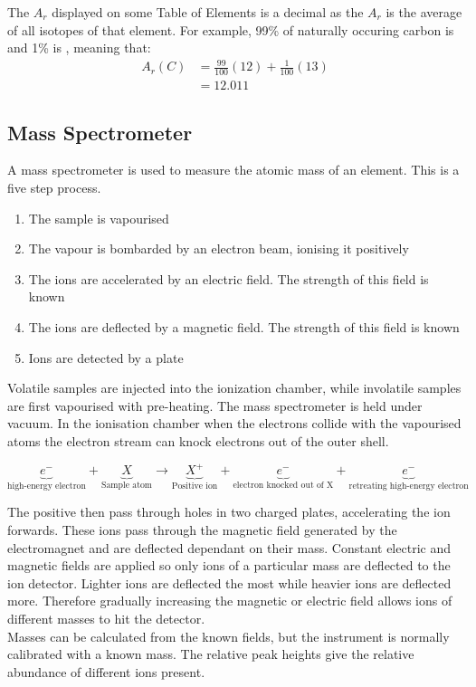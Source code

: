 \documentclass[a4paper, 12pt]{article}
\begin{document}
	The $A_r$ displayed on some Table of Elements is a decimal as the $A_r$ is the average of all isotopes of that element. For example, 99\% of naturally occuring carbon is  and 1\% is , meaning that:
	\begin{align*}
		A_r(C) &= \frac{99}{100}(12) + \frac{1}{100}(13) \\
			  &= 12.011
	\end{align*}

	\subsection{Mass Spectrometer}
		A mass spectrometer is used to measure the atomic mass of an element. This is a five step process.
	\begin{enumerate}
		\item The sample is vapourised
		\item The vapour is bombarded by an electron beam, ionising it positively
		\item The ions are accelerated by an electric field. The strength of this field is known
		\item The ions are deflected by a magnetic field. The strength of this field is known
		\item Ions are detected by a plate
	\end{enumerate}
	
	Volatile samples are injected into the ionization chamber, while involatile samples are first vapourised with pre-heating. The mass spectrometer is held under vacuum. In the ionisation chamber when the electrons collide with the vapourised atoms the electron stream can knock electrons out of the outer shell.

	\[ \underbrace{e^-}_\text{high-energy electron} + \underbrace{X}_\text{Sample atom} \to \underbrace{X^+}_\text{Positive ion} + \underbrace{e^-}_\text{electron knocked out of X} + \underbrace{e^-}_\text{retreating high-energy electron} \]

	The positive then pass through holes in two charged plates, accelerating the ion forwards. These ions pass through the magnetic field generated by the electromagnet and are deflected dependant on their mass. Constant electric and magnetic fields are applied so only ions of a particular mass are deflected to the ion detector. Lighter ions are deflected the most while heavier ions are deflected more. Therefore gradually increasing the magnetic or electric field allows ions of different masses to hit the detector. \\
	Masses can be calculated from the known fields, but the instrument is normally calibrated with a known mass. The relative peak heights give the relative abundance of different ions present. 
\end{document}
